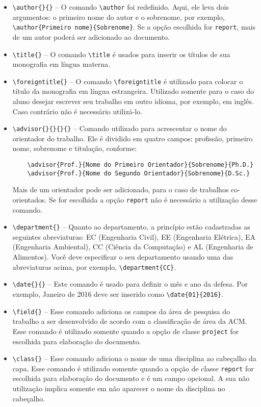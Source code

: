 \documentclass[report]{uftex}
\begin{document}
\begin{itemize}
\item \verb+\author{}{}+ -- O comando \verb+\author+ foi redefinido. Aqui, ele leva dois argumentos: o primeiro nome do autor e o sobrenome, por exemplo, \verb+\author{Primeiro nome}{Sobrenome}+. Se a opção escolhida for \verb+report+, mais de um autor poderá ser adicionado ao documento.
\item \verb+\title{}+ -- O comando \verb+\title+  é usados para inserir os títulos de sua monografia em língua materna.
\item \verb+\foreigntitle{}+ -- O comando \verb+\foreigntitle+ é utilizado para colocar o título da monografia em língua estrangeira. Utilizado somente para o caso do aluno desejar escrever seu trabalho em outro idioma, por exemplo, em inglês. Caso contrário não é necessário utilizá-lo.
\item \verb+\advisor{}{}{}{}+ -- Comando utilizado para acrescentar o nome do orientador do trabalho. Ele é dividido em quatro campos: profissão, primeiro nome, sobrenome e titulação, conforme:

\begin{verbatim}
	\advisor{Prof.}{Nome do Primeiro Orientador}{Sobrenome}{Ph.D.}
	\advisor{Prof.}{Nome do Segundo Orientador}{Sobrenome}{D.Sc.}
\end{verbatim}

Mais de um orientador pode ser adicionado, para o caso de trabalhos co-orientados. Se for escolhida a opção \verb+report+ não é necessário a utilização desse comando.
\item \verb+\department{}+ -- Quanto ao departamento, a princípio estão cadastradas as seguintes abreviaturas: EC (Engenharia Civil), EE (Engenharia Elétrica), EA (Engenharia Ambiental), CC (Ciência da Computação) e AL (Engenharia de Alimentos). Você deve especificar o seu departamento usando uma das abreviaturas acima, por exemplo, \verb+\department{CC}+.
\item \verb+\date{}{}+ -- Este comando é usado para definir o mês e ano da defesa. Por exemplo, Janeiro de 2016 deve ser inserido como \verb+\date{01}{2016}+.
\item \verb+\field{}+ -- Esse comando adiciona os campos da área de pesquisa do trabalho a ser desenvolvido de acordo com a classificação de área da ACM. Esse comando é utilizado somente quando a opção de classe \verb+project+ for escolhida para elaboração do documento.
\item \verb+\class{}+ -- Esse comando adiciona o nome de uma disciplina ao cabeçalho da capa. Esse comando é utilizado somente quando a opção de classe \verb+report+ for escolhida para elaboração do documento e é um campo opcional. A sua não utilização implica somente em não aparecer o nome da disciplina no cabeçalho.
\end{itemize}
\end{document}
